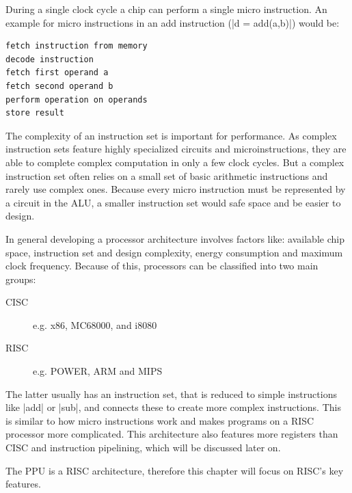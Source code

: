 During a single clock cycle a chip can perform a single micro instruction.
An example for micro instructions in an add instruction (|d = add(a,b)|) would be:
\begin{lstlisting}[caption=Example of Micro Instructions in an {\tt add} instruction, label=lst:microinstruction]
fetch instruction from memory
decode instruction
fetch first operand a
fetch second operand b
perform operation on operands
store result
\end{lstlisting}

The complexity of an instruction set is important for performance. 
As complex instruction sets feature highly specialized circuits and microinstructions, they are able to complete complex computation in only a few clock cycles.
But a complex instruction set often relies on a small set of basic arithmetic instructions and rarely use complex ones.
Because every micro instruction must be represented by a circuit in the \ac{ALU}, a smaller instruction set would safe space and be easier to design.

In general developing a processor architecture involves factors like: available chip space, instruction set and design complexity, energy consumption and maximum clock frequency.
Because of this, processors can be classified into two main groups:
\begin{description}
    \item[\ac{CISC}] e.g. x86, MC68000, and i8080
    \item[\ac{RISC}] e.g. \acs{POWER}, ARM and MIPS
\end{description}
The latter usually has an instruction set, that is reduced to simple instructions like |add| or |sub|, and connects these to create more complex instructions.
This is similar to how micro instructions work and makes programs on a \ac{RISC} processor more complicated.
This architecture also features more registers than \ac{CISC} and instruction pipelining, which will be discussed later on.

The \ac{PPU} is a \ac{RISC} architecture, therefore this chapter will focus on \ac{RISC}'s key features.

